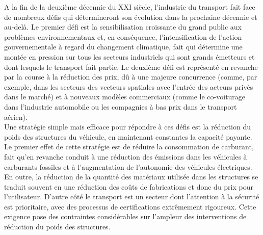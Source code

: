 A la fin de la deuxi\`eme d\'ecennie du XXI si\`ecle, l'industrie du transport fait face de nombreux d\'efis qui d\'etermineront son \'evolution dans la prochaine d\'ecennie et au-del\`a. Le premier d\'efi est la sensibilisation croissante du grand public aux probl\`emes environnementaux et, en cons\'equence, l'intensification de l'action gouvernementale \`a regard du changement climatique, fait qui d\'etermine une mont\'ee en pression sur tous les secteurs industriels qui sont grands \'emetteurs et dont lesquels le transport fait partie. Le deuxi\`eme d\'efi est repr\'esent\'e en revanche par la course \`a la r\'eduction des prix, d\^u \`a une majeure concurrence (comme, par exemple, dans les secteurs des vecteurs spatiales avec l'entr\'ee des acteurs priv\'es dans le march\'e) et \`a nouveaux mod\`eles commerciaux (comme le co-voiturage dans l'industrie automobile ou les compagnies \`a bas prix dans le transport a\'erien).\\

Une strat\'egie simple mais efficace pour r\'epondre \`a ces d\'efis est la r\'eduction du poids des structures du v\'ehicule, en maintenant constantes la capacit\'e payante. Le premier effet de cette strat\'egie est de r\'eduire la consommation de carburant, fait qu'en revanche conduit \`a une r\'eduction des \'emissions dans les v\'ehicules \`a carburants fossiles et \`a l'augmentation de l'autonomie des v\'ehicules \'electriques. En outre, la r\'eduction de la quantit\'e des mat\'eriaux utilis\'ee dans les structures se traduit souvent en une r\'eduction des co\^uts de fabrications et donc du prix pour l'utilisateur. D'autre c\^ot\'e le transport est un secteur dont l'attention \`a la s\'ecurit\'e est prioritaire, avec des processus de certifications extr\^emement rigoureux. Cette exigence pose des contraintes consid\'erables sur l'ampleur des interventions de r\'eduction du poids des structures.\\


